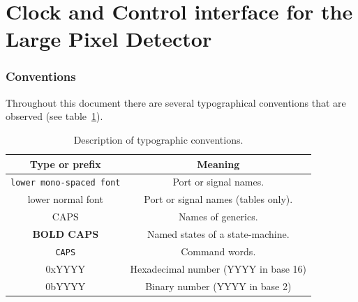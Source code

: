 \part{Clock and Control interface for the Large Pixel Detector} %
\label{prt:lpd_ccc_interface}

\section{Conventions} %
\label{sec:conventions}
Throughout this document there are several typographical conventions that are observed (see table~\ref{tab:typography}).
\begin{table}
  \begin{center}
  \begin{tabular}{c|c}
    Type or prefix                  & Meaning                             \\
    \hline                                                   
    \texttt{lower mono-spaced font} & Port or signal names.               \\
    lower normal font               & Port or signal names (tables only). \\
    CAPS                            & Names of generics.                  \\
    \textbf{BOLD CAPS}              & Named states of a state-machine.    \\
    \texttt{CAPS}                   & Command words.                      \\
    0xYYYY                          & Hexadecimal number (YYYY in base 16)\\
    0bYYYY                          & Binary number (YYYY in base 2)      \\
  \end{tabular}
  \end{center}
  \caption{Description of typographic conventions.}
  \label{tab:typography}
\end{table}
